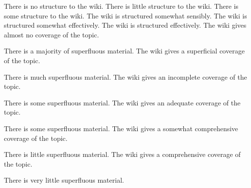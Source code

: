 \documentclass{../../fal_assignment}
\begin{document}
%

\rubricyeartwo
\begin{markingrubric}
%
%
        \grade\fail 	There is no structure to the wiki.
        \grade		There is little structure to the wiki.
        \grade 		There is some structure to the wiki.
        \grade 		The wiki is structured somewhat sensibly.
        \grade 		The wiki is structured somewhat effectively.
        \grade 		The wiki is structured effectively.
%
        \grade\fail		The wiki gives almost no coverage of the topic.
				\par			There is a majority of superfluous material.
        \grade			The wiki gives a superficial coverage of the topic.
				\par			There is much superfluous material.
        \grade 		The wiki gives an incomplete coverage of the topic.
				\par			There is some superfluous material.
        \grade 		The wiki gives an adequate coverage of the topic.
				\par			There is some superfluous material.
        \grade 		The wiki gives a somewhat comprehensive coverage of the topic.
				\par			There is little superfluous material.
        \grade 		The wiki gives a comprehensive coverage of the topic.
				\par			There is very little superfluous material.

\end{markingrubric}
\end{document}
